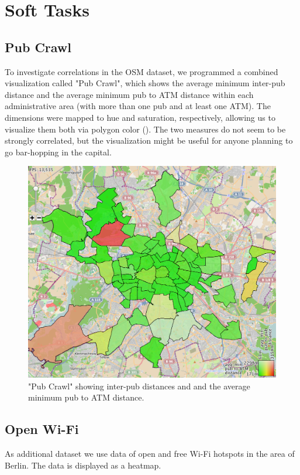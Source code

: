\section*{Soft Tasks}
\subsection*{Pub Crawl}
To investigate correlations in the OSM dataset, we programmed a combined visualization
called "Pub Crawl", which shows the average minimum inter-pub distance and the average
minimum pub to ATM distance within each administrative area
(with more than one pub and at least one ATM). The dimensions were mapped to hue
and saturation, respectively, allowing us to visualize them both via polygon color ().
The two measures do not seem to be strongly correlated, but the visualization might
be useful for anyone planning to go bar-hopping in the capital.

\begin{figure}
\centering
\includegraphics[width=0.9\linewidth]{imgs/crawl}
\caption{"Pub Crawl" showing inter-pub distances and and the average minimum pub to ATM distance.}
\label{fig:crawl}
\end{figure}

\subsection*{Open Wi-Fi}

As additional dataset we use data of open and free Wi-Fi hotspots in
the area of Berlin.
The data is displayed as a heatmap.

